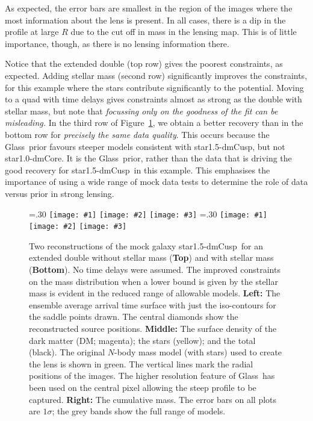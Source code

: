 \documentclass[galley,usenatbib]{mn2e}
\newcommand{\Glass}{{\sc Glass}}
\newcommand{\figref}[1] {Figure~\ref{#1}}
\newcommand{\mockAA}{{\sc star1.0-dmCore}}
\newcommand{\mockBC}{{\sc star1.5-dmCusp}}
\newcommand\plotthree[3]{{%
 \centering
 \leavevmode
 \columnwidth=.30\textwidth
 \texttt{[image: \#1]}%
 \hfil
 \texttt{[image: \#2]}%
 \hfil
 \texttt{[image: \#3]}%
}}%
\begin{document}
As expected, the error bars are smallest in the region of the images where the
most information about the lens is present. In all cases, there is a dip in the
profile at large $R$ due to the cut off in mass in the lensing map. This is of
little importance, though, as there is no lensing information there. 

Notice that the extended double (top row) gives the poorest constraints, as
expected. Adding stellar mass (second row) significantly improves the
constraints, for this example where the stars contribute significantly to the
potential. Moving to a quad with time delays gives constraints almost as strong
as the double with stellar mass, but note that {\it focussing only on the
goodness of the fit can be misleading.} In the third row of
\figref{reconstruction}, we obtain a better recovery than in the bottom row for
{\it precisely the same data quality}. This occurs because the \Glass\ prior
favours steeper models consistent with \mockBC, but not \mockAA. It is the
\Glass\ prior, rather than the data that is driving the good recovery for
\mockBC\ in this example. This emphasises the importance of using a wide range
of mock data tests to determine the role of data versus prior in strong
lensing.

\begin{figure}
  \plotthree{BCExtendedDoubleR1_tms-a.pdf} {BCExtendedDoubleR1_tms-b.pdf} {BCExtendedDoubleR1_tms-c.pdf}
  \plotthree{BCExtendedDoubleR1_tmS-a-1.pdf} {BCExtendedDoubleR1_tmS-b-1.pdf} {BCExtendedDoubleR1_tmS-c-1.pdf}
\caption{
    Two reconstructions of the mock galaxy \mockBC\ for an extended
    double without stellar mass (\textbf{Top}) and with stellar mass
    (\textbf{Bottom}).  No time delays were assumed.  The improved constraints
    on the mass distribution when a lower bound is given by the stellar mass is
    evident in the reduced range of allowable models.  
\textbf{Left:}
The ensemble average arrival time surface with just the iso-contours for the
saddle points drawn. The central diamonds show the reconstructed source
positions.
\textbf{Middle:}
The surface density of the dark matter (DM; magenta); the stars (yellow); and the total (black).
The original $N$-body mass model (with stars) used to create the lens is shown in green.
The vertical lines mark the radial positions of the images. The higher
resolution feature of \Glass\ has been used on the central pixel allowing the
steep profile to be captured.
\textbf{Right:}
The cumulative mass. The error bars on all plots are $1\sigma$; the grey bands show the full range of models.}
\label{reconstruction}
\end{figure}
\end{document}
